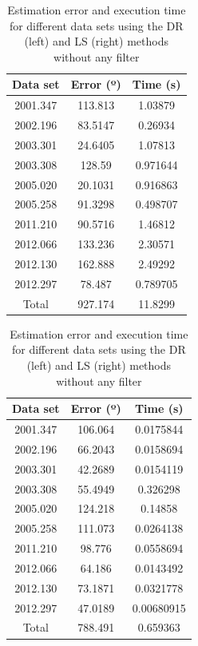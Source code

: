 \begin{table}[h!]
	\centering
	\def\arraystretch{1.2}
	\begin{tabular}{|c c c|} 
		\hline
		Data set & Error (º) & Time (s) \\ [0.3ex] 
		\hline\hline
		2001.347 & 113.813 & 1.03879 \\
		\hline
		2002.196 & 83.5147 & 0.26934 \\
		\hline
		2003.301 & 24.6405 & 1.07813 \\
		\hline
		2003.308 & 128.59 & 0.971644 \\
		\hline
		2005.020 & 20.1031 & 0.916863 \\
		\hline
		2005.258 & 91.3298 & 0.498707 \\
		\hline
		2011.210 & 90.5716 & 1.46812 \\
		\hline
		2012.066 & 133.236 & 2.30571 \\
		\hline
		2012.130 & 162.888 & 2.49292 \\
		\hline
		2012.297 & 78.487 & 0.789705 \\
		\hline
		Total & 927.174 & 11.8299 \\
		\hline
	\end{tabular}
	\quad\quad\quad
	\begin{tabular}{|c c c|} 
		\hline
		Data set & Error (º) & Time (s) \\ [0.3ex] 
		\hline\hline
		2001.347 & 106.064 & 0.0175844 \\
		\hline
		2002.196 & 66.2043 & 0.0158694 \\
		\hline
		2003.301 & 42.2689 & 0.0154119 \\
		\hline
		2003.308 & 55.4949 & 0.326298 \\
		\hline
		2005.020 & 124.218 & 0.14858 \\
		\hline
		2005.258 & 111.073 & 0.0264138 \\
		\hline
		2011.210 & 98.776 & 0.0558694 \\
		\hline
		2012.066 & 64.186 & 0.0143492 \\
		\hline
		2012.130 & 73.1871 & 0.0321778 \\
		\hline
		2012.297 & 47.0189 & 0.00680915 \\
		\hline\hline
		Total & 788.491 & 0.659363 \\
		\hline
	\end{tabular}
	\caption{Estimation error and execution time for different data sets using the DR (left) and LS (right) methods without any filter}
\end{table}

